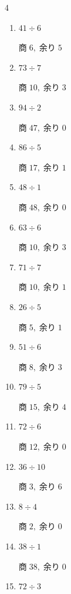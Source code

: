 \begin{multicols}{4}
\begin{enumerate}
        $商\; 0,\; 余り\; 8$

  \item $41 \div 6$

        $商\; 6,\; 余り\; 5$

  \item $73 \div 7$

        $商\; 10,\; 余り\; 3$

  \item $94 \div 2$

        $商\; 47,\; 余り\; 0$

  \item $86 \div 5$

        $商\; 17,\; 余り\; 1$

  \item $48 \div 1$

        $商\; 48,\; 余り\; 0$

  \item $63 \div 6$

        $商\; 10,\; 余り\; 3$

\columnbreak %

  \item $71 \div 7$

        $商\; 10,\; 余り\; 1$

  \item $26 \div 5$

        $商\; 5,\; 余り\; 1$

  \item $51 \div 6$

        $商\; 8,\; 余り\; 3$

  \item $79 \div 5$

        $商\; 15,\; 余り\; 4$

  \item $72 \div 6$

        $商\; 12,\; 余り\; 0$

  \item $36 \div 10$

        $商\; 3,\; 余り\; 6$

  \item $8 \div 4$

        $商\; 2,\; 余り\; 0$

  \item $38 \div 1$

        $商\; 38,\; 余り\; 0$

  \item $72 \div 3$


\end{enumerate}
\end{multicols}
